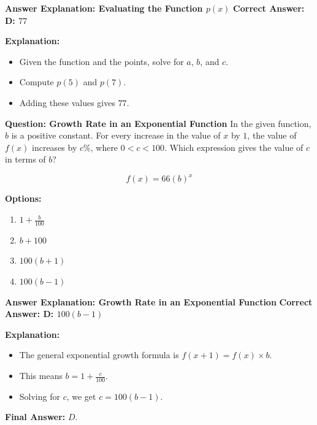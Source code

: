 \documentclass{beamer}
\begin{document}
\begin{frame}{\textbf{Answer Explanation: Evaluating the Function \( p(x) \)}}
    \textbf{Correct Answer: \textcolor{novelPurple}{D: \(77\)}}

    \vspace{0.3cm}
    \textbf{Explanation:}
    \begin{itemize}
        \item Given the function and the points, solve for \(a\), \(b\), and \(c\).
        \item Compute \(p(5)\) and \(p(7)\).
        \item Adding these values gives \( \boxed{77} \).
    \end{itemize}
\end{frame}
\begin{frame}{\textbf{Question: Growth Rate in an Exponential Function}}
    In the given function, \(b\) is a positive constant. For every increase in the value of \(x\) by \(1\), the value of \(f(x)\) increases by \(c\%\), where \(0 < c < 100\). Which expression gives the value of \(c\) in terms of \(b\)?

    \[
    f(x) = 66(b)^x
    \]

    \vspace{0.5cm}
    \textbf{Options:}
    \begin{enumerate}
        \item[A] \(1 + \frac{b}{100}\)
        \item[B] \(b + 100\)
        \item[C] \(100(b + 1)\)
        \item[D] \(100(b - 1)\)
    \end{enumerate}
\end{frame}

\begin{frame}{\textbf{Answer Explanation: Growth Rate in an Exponential Function}}
    \textbf{Correct Answer: \textcolor{novelPurple}{D: \(100(b - 1)\)}}

    \vspace{0.3cm}
    \textbf{Explanation:}
    \begin{itemize}
        \item The general exponential growth formula is \( f(x+1) = f(x) \times b \).
        \item This means \( b = 1 + \frac{c}{100} \).
        \item Solving for \( c \), we get \( c = 100(b - 1) \).
    \end{itemize}

    \textbf{Final Answer:} \( \boxed{D} \).
\end{frame}
\end{document}
